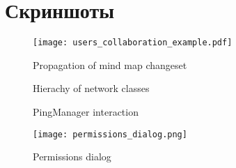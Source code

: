 \newpage
\appendix
{}
\chapter{Скриншоты}

\begin{figure}[!h]
  \centering
  \texttt{[image: users\_collaboration\_example.pdf]}
  \caption{Propagation of mind map changeset}
  \label{users_collaboration_example}
\end{figure} 

\begin{figure}
\begin{minipage}[t]{0.64\linewidth}
  \caption{Hierachy of network classes}
  \label{Network classes}
\end{minipage}
\hfill
\begin{minipage}[t]{0.34\linewidth}
  \caption{PingManager interaction}
  \label{Ping manager}
\end{minipage}
\end{figure}

\begin{figure}[b] \centering
  \texttt{[image: permissions\_dialog.png]}
  \caption{Permissions dialog}
  \label{Permissions dialog}
\end{figure}